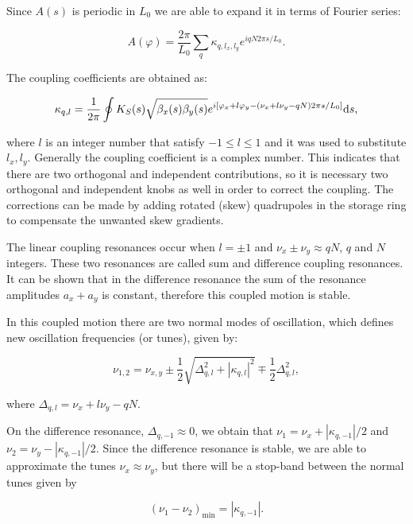 Since $A(s)$ is periodic in $L_0$ we are able to expand it in terms of Fourier series:

\begin{equation*}
    A(\varphi) = \dfrac{2\pi}{L_0} \sum_{q} \kappa_{q, l_x, l_y}e^{i q N 2 \pi s/L_0}.
\end{equation*}

The coupling coefficients are obtained as:

\begin{equation}
    \kappa_{q, l} = \dfrac{1}{2\pi} \oint K_S(s) \sqrt{\beta_x(s) \beta_y(s)} e^{i\left[\varphi_x + l\varphi_y - \left(\nu_x + l\nu_y - qN\right)2\pi s/L_0\right]}\mathrm{d} s,
\end{equation}

where $l$ is an integer number that satisfy $-1 \leq l \leq 1$ and it was used to substitute $l_x, l_y$. Generally the coupling coefficient is a complex number. This indicates that there are two orthogonal and independent contributions, so it is necessary two orthogonal and independent knobs as well in order to correct the coupling. The corrections can be made by adding rotated (skew) quadrupoles in the storage ring to compensate the unwanted skew gradients.

The linear coupling resonances occur when $l = \pm 1$ and $\nu_x \pm \nu_y \approx qN$, $q$ and $N$ integers. These two resonances are called sum and difference coupling resonances. It can be shown that in the difference resonance the sum of the resonance amplitudes $a_x + a_y$ is constant, therefore this coupled motion is stable.

In this coupled motion there are two normal modes of oscillation, which defines new oscillation frequencies (or tunes), given by:

\begin{equation}
    \nu_{1, 2} = \nu_{x, y} \pm \dfrac{1}{2}\sqrt{\Delta_{q, l}^2 + |\kappa_{q, l}|^2} \mp \dfrac{1}{2}\Delta_{q, l}^2,
\end{equation}

where $\Delta_{q, l} = \nu_x + l\nu_y - q N$. 

On the difference resonance, $\Delta_{q, -1} \approx 0$, we obtain that $\nu_1 = \nu_x + |\kappa_{q, -1}|/2$ and $\nu_2 = \nu_y - |\kappa_{q, -1}|/2$. Since the difference resonance is stable, we are able to approximate the tunes $\nu_x \approx \nu_y$, but there will be a stop-band between the normal tunes given by

\begin{equation}
\left(\nu_1 - \nu_2\right)_{\mathrm{min}} = |\kappa_{q, -1}|.
\end{equation}

